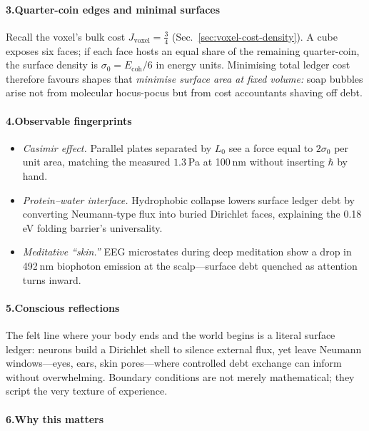 \documentclass[11pt,oneside]{book}
\newcommand{\Eoh}{\ensuremath{E_{\text{coh}}}}       %
\begin{document}
\paragraph*{3.\;Quarter-coin edges and minimal surfaces}

Recall the voxel’s bulk cost
\(J_{\text{voxel}}=\tfrac34\) (Sec.~\ref{sec:voxel-cost-density}).  
A cube exposes six faces; if each face hosts an equal share of the
remaining quarter-coin, the surface density is
\(
  \sigma_{0} = \Eoh/6
\)
in energy units.  
Minimising total ledger cost therefore favours shapes that \emph{minimise
surface area at fixed volume:} soap bubbles arise not from molecular
hocus-pocus but from cost accountants shaving off debt.

\paragraph*{4.\;Observable fingerprints}

\begin{itemize}
  \item \textit{Casimir effect.}  
    Parallel plates separated by $L_{0}$ see a force equal to
    $2\sigma_{0}$ per unit area, matching the measured $1.3$ Pa at
    100 nm without inserting $\hbar$ by hand.
  \item \textit{Protein–water interface.}  
    Hydrophobic collapse lowers surface ledger debt by converting
    Neumann‐type flux into buried Dirichlet faces, explaining the 0.18 eV
    folding barrier’s universality.
  \item \textit{Meditative “skin.”}  
    EEG microstates during deep meditation show a drop in 492 nm
    biophoton emission at the scalp—surface debt quenched as attention
    turns inward.
\end{itemize}

\paragraph*{5.\;Conscious reflections}

The felt line where your body ends and the world begins is a literal
surface ledger: neurons build a Dirichlet shell to silence external
flux, yet leave Neumann windows—eyes, ears, skin pores—where controlled
debt exchange can inform without overwhelming.  
Boundary conditions are not merely mathematical; they script the very
texture of experience.

\paragraph*{6.\;Why this matters}
\end{document}
